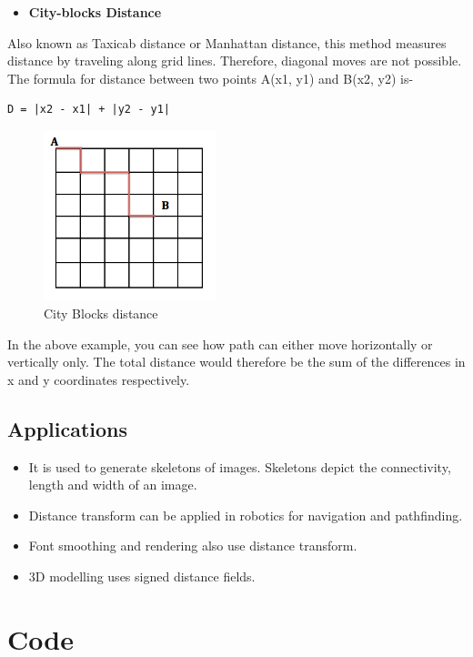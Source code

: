 \documentclass[]{article}
\providecommand{\tightlist}{%
  \setlength{\itemsep}{0pt}\setlength{\parskip}{0pt}}
\begin{document}
\begin{itemize}
\tightlist
\item
  \textbf{City-blocks Distance}
\end{itemize}

Also known as Taxicab distance or Manhattan distance, this method
measures distance by traveling along grid lines. Therefore, diagonal
moves are not possible. The formula for distance between two points
A(x1, y1) and B(x2, y2) is-

\begin{verbatim}
D = |x2 - x1| + |y2 - y1|
\end{verbatim}

\begin{figure}[htbp]
\centering
\includegraphics[width=5cm]{images/Distance Transform/City blocks Distance.png}
\caption{City Blocks distance}
\end{figure}

In the above example, you can see how path can either move horizontally
or vertically only. The total distance would therefore be the sum of the
differences in x and y coordinates respectively.

\subsection{Applications}\label{applications}

\begin{itemize}
\tightlist
\item
  It is used to generate skeletons of images. Skeletons depict the
  connectivity, length and width of an image.
\item
  Distance transform can be applied in robotics for navigation and
  pathfinding.
\item
  Font smoothing and rendering also use distance transform.
\item
  3D modelling uses signed distance fields.
\end{itemize}
\pagebreak
\section{Code}\label{code}
\end{document}
